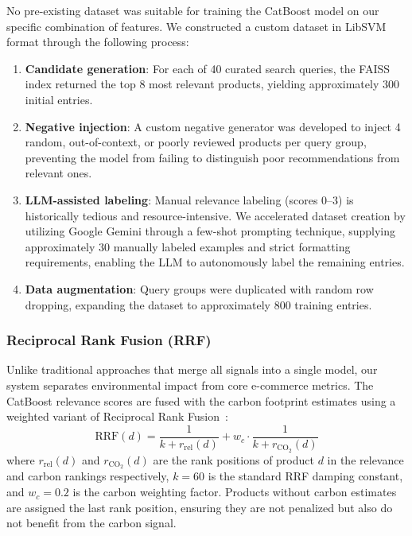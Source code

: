 \documentclass[conference]{IEEEtran}
\begin{document}
No pre-existing dataset was suitable for training the CatBoost model on our specific combination of features. We constructed a custom dataset in LibSVM format through the following process:

\begin{enumerate}
    \item \textbf{Candidate generation}: For each of 40 curated search queries, the FAISS index returned the top 8 most relevant products, yielding approximately 300 initial entries.
    \item \textbf{Negative injection}: A custom negative generator was developed to inject 4 random, out-of-context, or poorly reviewed products per query group, preventing the model from failing to distinguish poor recommendations from relevant ones.
    \item \textbf{LLM-assisted labeling}: Manual relevance labeling (scores 0--3) is historically tedious and resource-intensive. We accelerated dataset creation by utilizing Google Gemini through a few-shot prompting technique, supplying approximately 30 manually labeled examples and strict formatting requirements, enabling the LLM to autonomously label the remaining entries.
    \item \textbf{Data augmentation}: Query groups were duplicated with random row dropping, expanding the dataset to approximately 800 training entries.
\end{enumerate}

\subsubsection{Reciprocal Rank Fusion (RRF)}

Unlike traditional approaches that merge all signals into a single model, our system separates environmental impact from core e-commerce metrics. The CatBoost relevance scores are fused with the carbon footprint estimates using a weighted variant of Reciprocal Rank Fusion~\cite{rrf}:
\begin{equation}
\text{RRF}(d) = \frac{1}{k + r_{\text{rel}}(d)} + w_c \cdot \frac{1}{k + r_{\text{CO}_2}(d)}
\label{eq:rrf}
\end{equation}
where $r_{\text{rel}}(d)$ and $r_{\text{CO}_2}(d)$ are the rank positions of product $d$ in the relevance and carbon rankings respectively, $k = 60$ is the standard RRF damping constant, and $w_c = 0.2$ is the carbon weighting factor. Products without carbon estimates are assigned the last rank position, ensuring they are not penalized but also do not benefit from the carbon signal.
\end{document}
